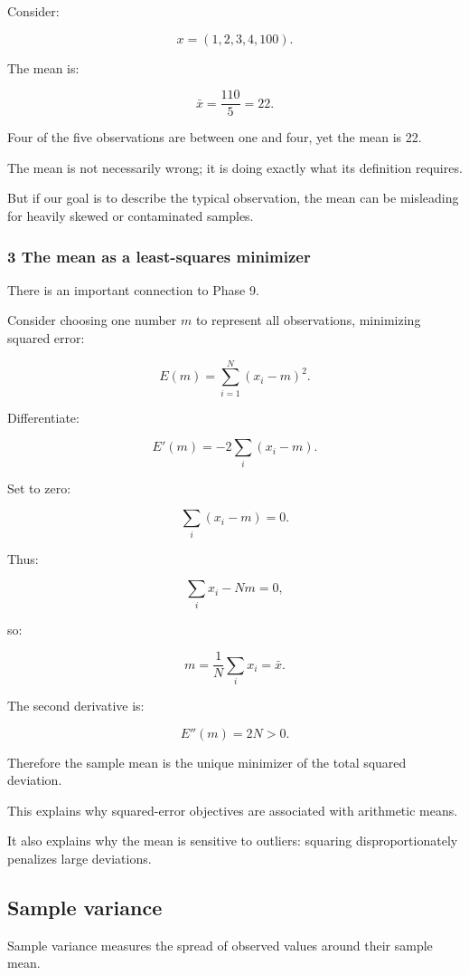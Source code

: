 Consider:

\[
 x=(1,2,3,4,100).
\]

The mean is:

\[
 \bar x=\frac{110}{5}=\boxed{22}.
\]

Four of the five observations are between one and four, yet the mean is 22.

The mean is not necessarily wrong; it is doing exactly what its definition requires.

But if our goal is to describe the typical observation, the mean can be misleading for heavily skewed or contaminated samples.

\subsubsection{3 The mean as a least-squares minimizer}\label{02-foundations-ii-ch030-the-mean-as-a-least-squares-minimizer}

There is an important connection to Phase 9.

Consider choosing one number \(m\) to represent all observations, minimizing squared error:

\[
 E(m)= \sum_{i=1}^{N}(x_i-m)^2.
\]

Differentiate:

\[
 E'(m)= -2\sum_i(x_i-m).
\]

Set to zero:

\[
 \sum_i(x_i-m)=0.
\]

Thus:

\[
 \sum_ix_i-Nm=0,
\]

so:

\[
 \boxed{ m=\frac1N\sum_ix_i=\bar x }.
\]

The second derivative is:

\[
 E''(m)=2N>0.
\]

Therefore the sample mean is the unique minimizer of the total squared deviation.

This explains why squared-error objectives are associated with arithmetic means.

It also explains why the mean is sensitive to outliers: squaring disproportionately penalizes large deviations.

\subsection{Sample variance}\label{02-foundations-ii-ch030-sample-variance}

Sample variance measures the spread of observed values around their sample mean.

